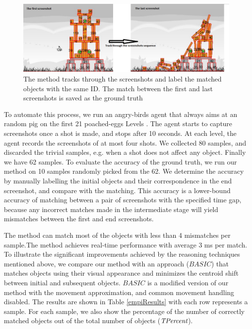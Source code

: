 \documentclass[letterpaper]{article}
\begin{document}
\begin{figure}[h!]
\centering\includegraphics[scale=0.32]{TrackingBackup.png}\caption{The method tracks through the screenshots and label the matched objects with the same ID. The match between the first and last screenshots is saved as the ground truth }
\label{Tracking}
\end{figure}

To automate this process, we run an angry-birds agent that always aims at an random pig on the first 21 poached-eggs Levels \cite{abGame}. The agent starts to capture screenshots once a shot is made, and stops after 10 seconds. At each level, the agent records the screenshots of at most four shots.
We collected 80 samples, and discarded the trivial samples, e.g. when a shot does not affect any object. Finally we have 62 samples. To evaluate the accuracy of the ground truth, we run our method on 10 samples randomly picked from the 62. We determine the accuracy by manually labelling the initial objects and their correspondence in the end screenshot, and compare with the matching. This accuracy is a lower-bound accuracy of matching between a pair of screenshots with the specified time gap, because any incorrect matches made in the intermediate stage will yield mismatches between the first and end screenshots.  

The method can match most of the objects with less than 4 mismatches per sample.The method achieves real-time performance with average 3 ms per match. To illustrate the significant improvements achieved by the reasoning techniques mentioned above, we compare our method with an approach ($BASIC$) that matches objects using their visual appearance and minimizes the centroid shift between initial and subsequent objects. $BASIC$ is a modified version of our method with the movement approximation, and common movement handling disabled. The results are shown in Table \ref{empiResults} with each row represents a sample. For each sample, we also show the percentage of the number of correctly matched objects out of the total number of objects ($\emph{TPercent}$).
\end{document}
